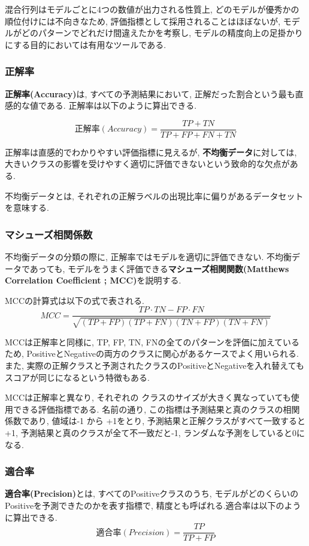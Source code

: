 \documentclass[dvipdfmx]{jsarticle}
\begin{document}
混合行列はモデルごとに4つの数値が出力される性質上, どのモデルが優秀かの順位付けには不向きなため, 評価指標として採用されることはほぼないが, モデルがどのパターンでどれだけ間違えたかを考察し, モデルの精度向上の足掛かりにする目的においては有用なツールである.

\subsubsection{正解率}
\textbf{正解率(Accuracy)}は, すべての予測結果において, 正解だった割合という最も直感的な値である.
正解率は以下のように算出できる.

\begin{equation}
    正解率(Accuracy) = \frac{TP + TN}{TP + FP + FN +TN}
\end{equation}




正解率は直感的でわかりやすい評価指標に見えるが, \textbf{不均衡データ}に対しては, 大きいクラスの影響を受けやすく適切に評価できないという致命的な欠点がある.

不均衡データとは, それぞれの正解ラベルの出現比率に偏りがあるデータセットを意味する.


\subsubsection{マシューズ相関係数}
不均衡データの分類の際に, 正解率ではモデルを適切に評価できない.
不均衡データであっても, モデルをうまく評価できる\textbf{マシューズ相関関数(Matthews Correlation Coefficient ; MCC)}を説明する.

MCCの計算式は以下の式で表される.
\begin{equation}
    MCC = \frac{TP \cdot TN - FP \cdot FN}{\sqrt{(TP + FP)(TP + FN)(TN + FP)(TN + FN)}}
\end{equation}

MCCは正解率と同様に, TP, FP, TN, FNの全てのパターンを評価に加えているため, PositiveとNegativeの両方のクラスに関心があるケースでよく用いられる.
また, 実際の正解クラスと予測されたクラスのPositiveとNegativeを入れ替えてもスコアが同じになるという特徴もある.

MCCは正解率と異なり, それぞれの
クラスのサイズが大きく異なっていても使用できる評価指標である.
名前の通り, この指標は予測結果と真のクラスの相関係数であり, 値域は-1 から +1をとり, 予測結果と正解クラスがすべて一致すると+1, 予測結果と真のクラスが全て不一致だと-1, ランダムな予測をしていると0になる.

\subsubsection{適合率}
\textbf{適合率(Precision)}とは, すべてのPositiveクラスのうち, モデルがどのくらいのPositiveを予測できたのかを表す指標で, 精度とも呼ばれる.適合率は以下のように算出できる.
\begin{equation}
    適合率(Precision) = \frac{TP}{TP+FP}
\end{equation}
\end{document}
